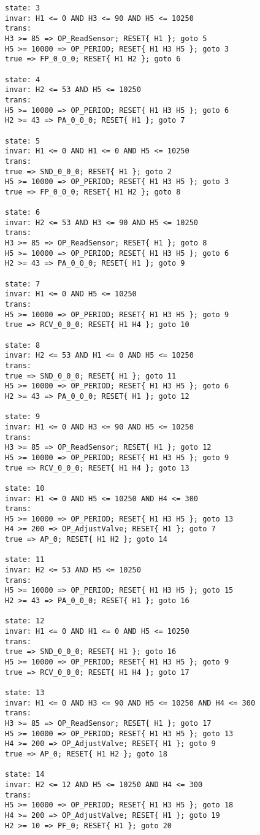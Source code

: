 {\begin{verbatim}
state: 3
invar: H1 <= 0 AND H3 <= 90 AND H5 <= 10250
trans: 
H3 >= 85 => OP_ReadSensor; RESET{ H1 }; goto 5
H5 >= 10000 => OP_PERIOD; RESET{ H1 H3 H5 }; goto 3
true => FP_0_0_0; RESET{ H1 H2 }; goto 6

state: 4
invar: H2 <= 53 AND H5 <= 10250
trans: 
H5 >= 10000 => OP_PERIOD; RESET{ H1 H3 H5 }; goto 6
H2 >= 43 => PA_0_0_0; RESET{ H1 }; goto 7

state: 5
invar: H1 <= 0 AND H1 <= 0 AND H5 <= 10250
trans: 
true => SND_0_0_0; RESET{ H1 }; goto 2
H5 >= 10000 => OP_PERIOD; RESET{ H1 H3 H5 }; goto 3
true => FP_0_0_0; RESET{ H1 H2 }; goto 8

state: 6
invar: H2 <= 53 AND H3 <= 90 AND H5 <= 10250
trans: 
H3 >= 85 => OP_ReadSensor; RESET{ H1 }; goto 8
H5 >= 10000 => OP_PERIOD; RESET{ H1 H3 H5 }; goto 6
H2 >= 43 => PA_0_0_0; RESET{ H1 }; goto 9

state: 7
invar: H1 <= 0 AND H5 <= 10250
trans: 
H5 >= 10000 => OP_PERIOD; RESET{ H1 H3 H5 }; goto 9
true => RCV_0_0_0; RESET{ H1 H4 }; goto 10

state: 8
invar: H2 <= 53 AND H1 <= 0 AND H5 <= 10250
trans: 
true => SND_0_0_0; RESET{ H1 }; goto 11
H5 >= 10000 => OP_PERIOD; RESET{ H1 H3 H5 }; goto 6
H2 >= 43 => PA_0_0_0; RESET{ H1 }; goto 12

state: 9
invar: H1 <= 0 AND H3 <= 90 AND H5 <= 10250
trans: 
H3 >= 85 => OP_ReadSensor; RESET{ H1 }; goto 12
H5 >= 10000 => OP_PERIOD; RESET{ H1 H3 H5 }; goto 9
true => RCV_0_0_0; RESET{ H1 H4 }; goto 13

state: 10
invar: H1 <= 0 AND H5 <= 10250 AND H4 <= 300
trans: 
H5 >= 10000 => OP_PERIOD; RESET{ H1 H3 H5 }; goto 13
H4 >= 200 => OP_AdjustValve; RESET{ H1 }; goto 7
true => AP_0; RESET{ H1 H2 }; goto 14

state: 11
invar: H2 <= 53 AND H5 <= 10250
trans: 
H5 >= 10000 => OP_PERIOD; RESET{ H1 H3 H5 }; goto 15
H2 >= 43 => PA_0_0_0; RESET{ H1 }; goto 16

state: 12
invar: H1 <= 0 AND H1 <= 0 AND H5 <= 10250
trans: 
true => SND_0_0_0; RESET{ H1 }; goto 16
H5 >= 10000 => OP_PERIOD; RESET{ H1 H3 H5 }; goto 9
true => RCV_0_0_0; RESET{ H1 H4 }; goto 17

state: 13
invar: H1 <= 0 AND H3 <= 90 AND H5 <= 10250 AND H4 <= 300
trans: 
H3 >= 85 => OP_ReadSensor; RESET{ H1 }; goto 17
H5 >= 10000 => OP_PERIOD; RESET{ H1 H3 H5 }; goto 13
H4 >= 200 => OP_AdjustValve; RESET{ H1 }; goto 9
true => AP_0; RESET{ H1 H2 }; goto 18

state: 14
invar: H2 <= 12 AND H5 <= 10250 AND H4 <= 300
trans: 
H5 >= 10000 => OP_PERIOD; RESET{ H1 H3 H5 }; goto 18
H4 >= 200 => OP_AdjustValve; RESET{ H1 }; goto 19
H2 >= 10 => PF_0; RESET{ H1 }; goto 20


\end{verbatim}}
